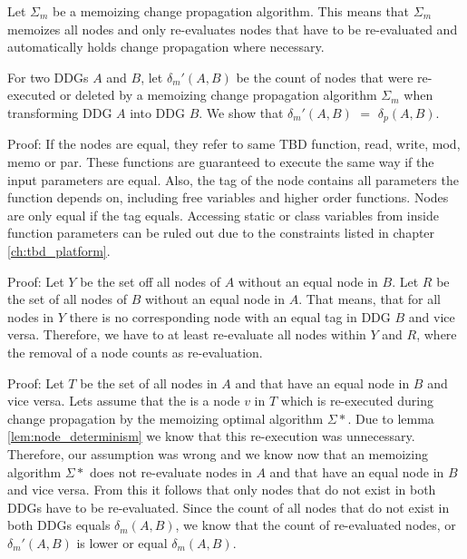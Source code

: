 \begin{definition}
Let $\Sigma_m$ be a memoizing change propagation algorithm. This means that $\Sigma_m$ memoizes all nodes and only re-evaluates nodes that have to be re-evaluated and automatically holds change propagation where necessary. 
\end{definition}

For two DDGs $A$ and $B$, let $\delta_m'(A, B)$ be the count of nodes that were re-executed or deleted by a memoizing change propagation algorithm $\Sigma_m$ when transforming DDG $A$ into DDG $B$. We show that $\delta_m'(A, B)$ $=$ $\delta_p(A, B)$. 

\begin{lemma}
\label{lem:node_determinism}
Proof: If the nodes are equal, they refer to same TBD function, read, write, mod, memo or par. These functions are guaranteed to execute the same way if the input parameters are equal. Also, the tag of the node contains all parameters the function depends on, including free variables and higher order functions. Nodes are only equal if the tag equals. Accessing static or class variables from inside function parameters can be ruled out due to the constraints listed in chapter \ref{ch:tbd_platform}.
\end{lemma}

\begin{lemma}
Proof: Let $Y$ be the set off all nodes of $A$ without an equal node in $B$. Let $R$ be the set of all nodes of $B$ without an equal node in $A$. That means, that for all nodes in $Y$ there is no corresponding node with an equal tag in DDG $B$ and vice versa. Therefore, we have to at least re-evaluate all nodes within $Y$ and $R$, where the removal of a node counts as re-evaluation. 
\end{lemma}


\begin{lemma}
Proof: Let $T$ be the set of all nodes in $A$ and that have an equal node in $B$ and vice versa. Lets assume that the is a node $v$ in $T$ which is re-executed during change propagation by the memoizing optimal algorithm $\Sigma*$. Due to lemma \ref{lem:node_determinism} we know that this re-execution was unnecessary. Therefore, our assumption was wrong and we know now that an memoizing algorithm $\Sigma*$ does not re-evaluate nodes in $A$ and that have an equal node in $B$ and vice versa. From this it follows that only nodes that do not exist in both DDGs have to be re-evaluated. Since the count of all nodes that do not exist in both DDGs equals $\delta_m(A, B)$, we know that the count of re-evaluated nodes, or $\delta_m'(A, B)$ is lower or equal $\delta_m(A, B)$. 
\end{lemma}

